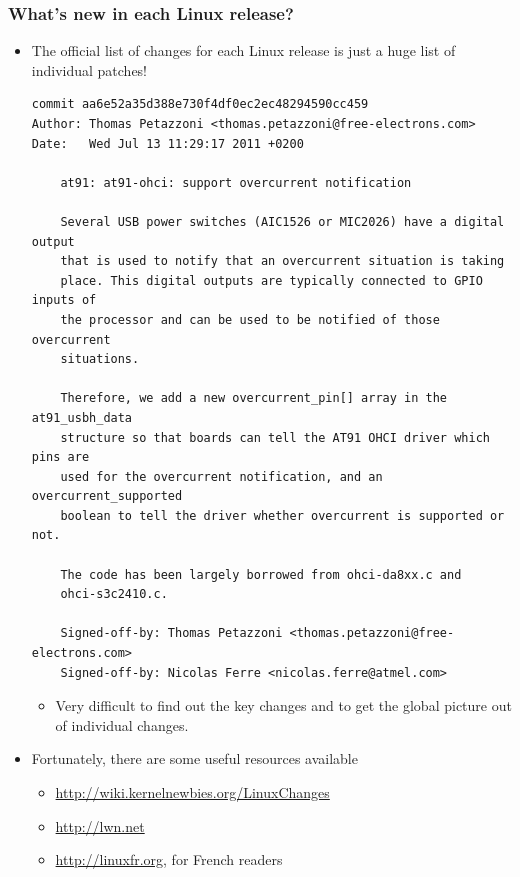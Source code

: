 \begin{frame}[fragile]
  \frametitle{What's new in each Linux release?}
  \begin{itemize}
  \item The official list of changes for each Linux release is just a
    huge list of individual patches!
\Tiny
    \begin{verbatim}
commit aa6e52a35d388e730f4df0ec2ec48294590cc459
Author: Thomas Petazzoni <thomas.petazzoni@free-electrons.com>
Date:   Wed Jul 13 11:29:17 2011 +0200

    at91: at91-ohci: support overcurrent notification

    Several USB power switches (AIC1526 or MIC2026) have a digital output
    that is used to notify that an overcurrent situation is taking
    place. This digital outputs are typically connected to GPIO inputs of
    the processor and can be used to be notified of those overcurrent
    situations.

    Therefore, we add a new overcurrent_pin[] array in the at91_usbh_data
    structure so that boards can tell the AT91 OHCI driver which pins are
    used for the overcurrent notification, and an overcurrent_supported
    boolean to tell the driver whether overcurrent is supported or not.

    The code has been largely borrowed from ohci-da8xx.c and
    ohci-s3c2410.c.

    Signed-off-by: Thomas Petazzoni <thomas.petazzoni@free-electrons.com>
    Signed-off-by: Nicolas Ferre <nicolas.ferre@atmel.com>
\end{verbatim}
\normalsize
    \begin{itemize}
    \item Very difficult to find out the key changes and to get the
      global picture out of individual changes.
    \end{itemize}
  \item Fortunately, there are some useful resources available
    \begin{itemize}
    \item \url{http://wiki.kernelnewbies.org/LinuxChanges}
    \item \url{http://lwn.net}
    \item \url{http://linuxfr.org}, for French readers
    \end{itemize}
  \end{itemize}
\end{frame}

